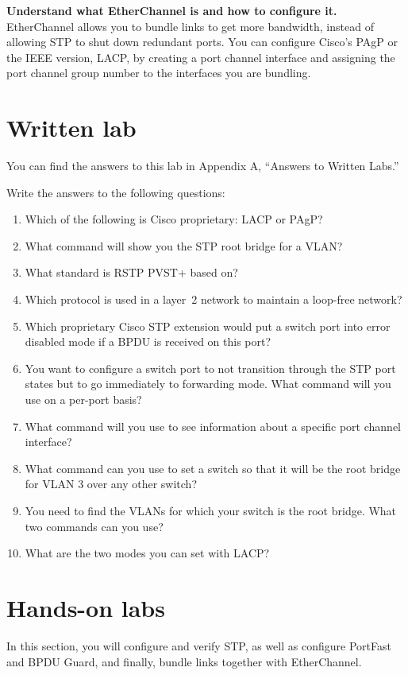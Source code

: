 \documentclass[b5paper,11pt]{memoir}
\begin{document}
\textbf{Understand what EtherChannel is and how to configure it.}
EtherChannel allows you to bundle links to get more bandwidth, instead
of allowing STP to shut down redundant ports. You can configure Cisco's
PAgP or the IEEE version, LACP, by creating a port channel interface and
assigning the port channel group number to the interfaces you are
bundling.

\section{Written lab}

You can find the answers to this lab in Appendix A, ``Answers to Written
Labs.''

Write the answers to the following questions:

\begin{enumerate}
\tightlist
\item
  Which of the following is Cisco proprietary: LACP or PAgP?
\item
  What command will show you the STP root bridge for a VLAN?
\item
  What standard is
  RSTP PVST+ based on?
\item
  Which protocol is used in a layer~2 network to maintain a loop-free
  network?
\item
  Which proprietary Cisco STP extension would put a switch port into
  error disabled mode if a BPDU is received on this port?
\item
  You want to configure a switch port to not transition through the STP
  port states but to go immediately to forwarding mode. What command
  will you use on a per-port basis?
\item
  What command will you use to see information about a specific port
  channel interface?
\item
  What command can you use to set a switch so that it will be the root
  bridge for VLAN 3 over any other switch?
\item
  You need to find the VLANs for which your switch is the root bridge.
  What two commands can you use?
\item
  What are the two modes you can set with LACP?
\end{enumerate}

\section{Hands-on labs}

In this section, you will configure and verify STP, as well as configure
PortFast and BPDU Guard, and finally, bundle links together with
EtherChannel.
\end{document}
